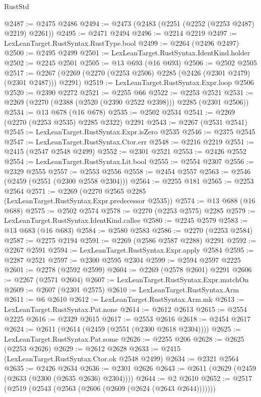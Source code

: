\begin{lexlean}{RustStd}
\begin{coremodule}
{\begin{coremodule}
{{{{{{{{{{{{@2487 := @2475 @2486
@2494 := @2473 (@2483 (@2251 (@2252 (@2253 @2487) @2219) @2261))
@2495 := @2471 @2494
@2496 := @2214 @2219
@2497 := LexLeanTarget.RustSyntax.RustType.bool
@2499 := @2264 (@2496 @2497)
@2500 := @2495 @2499
@2501 := LexLeanTarget.RustSyntax.IdentKind.holder
@2502 := @2245 @2501
@2505 := @13 @693 (@16 @693)
@2506 := @2502 @2505
@2517 := @2267 (@2269 (@2270 (@2253 @2506) @2285 (@2426 (@2301 @2479) (@2301 @2487))) @2291)
@2519 := LexLeanTarget.RustSyntax.Expr.loop @2506
@2520 := @2390 @2272
@2521 := @2255 @66
@2522 := @2253 @2521
@2531 := @2269 (@2270 (@2388 (@2520 (@2390 @2522 @2398))) @2285 (@2301 @2506))
@2534 := @13 @678 (@16 @678)
@2535 := @2502 @2534
@2541 := @2269 (@2270 (@2253 @2535) @2285 @2322) @2291
@2543 := @2267 (@2531 @2541)
@2545 := LexLeanTarget.RustSyntax.Expr.isZero @2535
@2546 := @2375 @2545
@2547 := LexLeanTarget.RustSyntax.Ctor.err
@2548 := @2216 @2219
@2551 := @2415 (@2547 @2548 @2499)
@2552 := @2301 @2521
@2553 := @2426 @2552
@2554 := LexLeanTarget.RustSyntax.Lit.bool
@2555 := @2554 @2307
@2556 := @2329 @2555
@2557 := @2553 @2556
@2558 := @2454 @2557
@2563 := @2546 (@2459 (@2551 (@2300 @2558 @2304)))
@2564 := @2255 @181
@2565 := @2253 @2564
@2571 := @2269 (@2270 @2565 @2285 (LexLeanTarget.RustSyntax.Expr.predecessor @2535))
@2574 := @13 @688 (@16 @688)
@2575 := @2502 @2574
@2578 := @2270 (@2253 @2575) @2285
@2579 := LexLeanTarget.RustSyntax.IdentKind.callee
@2580 := @2245 @2579
@2583 := @13 @683 (@16 @683)
@2584 := @2580 @2583
@2586 := @2270 (@2253 @2584)
@2587 := @2275 @2194
@2591 := @2269 (@2586 @2587 @2288) @2291
@2592 := @2267 @2591
@2594 := LexLeanTarget.RustSyntax.Expr.apply @2584
@2595 := @2287 @2521
@2597 := @2300 @2595 @2304
@2599 := @2594 @2597 @2225
@2601 := @2278 (@2592 @2599)
@2604 := @2269 (@2578 @2601) @2291
@2606 := @2267 (@2571 @2604)
@2607 := LexLeanTarget.RustSyntax.Expr.matchOn
@2609 := @2607 (@2301 @2575)
@2610 := LexLeanTarget.RustSyntax.Arm
@2611 := @6 @2610
@2612 := LexLeanTarget.RustSyntax.Arm.mk
@2613 := LexLeanTarget.RustSyntax.Pat.none
@2614 := @2612 @2613
@2615 := @2554 @2225
@2616 := @2329 @2615
@2617 := @2553 @2616
@2618 := @2454 @2617
@2624 := @2611 (@2614 (@2459 (@2551 (@2300 @2618 @2304))))
@2625 := LexLeanTarget.RustSyntax.Pat.some
@2626 := @2255 @206
@2628 := @2625 (@2253 @2626)
@2629 := @2612 @2628
@2633 := @2415 (LexLeanTarget.RustSyntax.Ctor.ok @2548 @2499)
@2634 := @2321 @2564
@2635 := @2426 @2634
@2636 := @2301 @2626
@2643 := @2611 (@2629 (@2459 (@2633 (@2300 (@2635 @2636) @2304))))
@2644 := @2 @2610
@2652 := @2517 (@2519 (@2543 (@2563 (@2606 (@2609 (@2624 (@2643 @2644)))))))
}}}}}}}}}}}}
\end{coremodule}}
\end{coremodule}
\end{lexlean}
